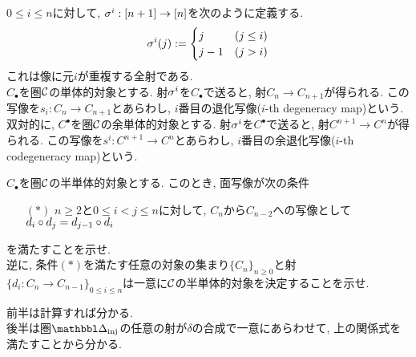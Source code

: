 \documentclass[uplatex, a4paper, 14Q, dvipdfmx]{jsreport}
\begin{document}
\begin{nota}
  $0 \leq i \leq n$に対して, $\sigma^i: [n+1] \to [n]$を次のように定義する.
  \begin{align*}
    \sigma^i(j) :=
    \begin{cases}
      j & (j \leq i) \\
      j-1 & (j > i)
    \end{cases}
  \end{align*} 
  これは像に元$i$が重複する全射である. \\
  $C_{\bullet}$を圏$\mathcal{C}$の単体的対象とする. 
  射$\sigma^i$を$C_{\bullet}$で送ると, 射$C_n \to C_{n+1}$が得られる. 
  この写像を$s_i: C_n \to C_{n+1}$とあらわし, $i$番目の退化写像($i$-th degeneracy map)という. \\
  双対的に, $C^{\bullet}$を圏$\mathcal{C}$の余単体的対象とする. 
  射$\sigma^i$を$C^{\bullet}$で送ると, 射$C^{n+1} \to C^n$が得られる. 
  この写像を$s^i: C^{n+1} \to C^n$とあらわし, $i$番目の余退化写像($i$-th codegeneracy map)という.
\end{nota}

\begin{exe}
  $C_{\bullet}$を圏$\mathcal{C}$の半単体的対象とする. 
  このとき, 面写像が次の条件
  \begin{itemize}
    \item[$(\ast)$] $n \geq 2$と$0 \leq i < j \leq n$に対して, $C_n$から$C_{n-2}$への写像として$d_i \circ d_j = d_{j-1} \circ d_i$
  \end{itemize}
  を満たすことを示せ. \\
  逆に, 条件$(\ast)$を満たす任意の対象の集まり$\{C_n\}_{n \geq 0}$と射$\{d_i: C_n \to C_{n-1}\}_{0 \leq i \leq n}$は一意に$\mathcal{C}$の半単体的対象を決定することを示せ. 
\end{exe} 

\begin{Proof}
  前半は計算すれば分かる. \\
  後半は圏$\insim$の任意の射が$\delta$の合成で一意にあらわせて, 上の関係式を満たすことから分かる. 
\end{Proof}  
\end{document}
